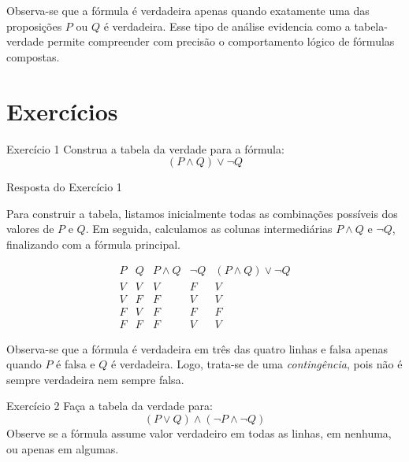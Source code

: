 \documentclass[12pt,a4paper,openright]{book}
\begin{document}
Observa-se que a fórmula é verdadeira apenas quando exatamente uma das proposições \(P\) ou \(Q\) é verdadeira. Esse tipo de análise evidencia como a tabela-verdade permite compreender com precisão o comportamento lógico de fórmulas compostas.
\section{Exercícios}

\begin{block}{Exercício 1}
Construa a tabela da verdade para a fórmula:
\[
(P \land Q) \lor \neg Q
\]
\end{block}

\begin{block}{Resposta do Exercício 1}

Para construir a tabela, listamos inicialmente todas as combinações possíveis dos valores de \(P\) e \(Q\). Em seguida, calculamos as colunas intermediárias \(P \land Q\) e \(\neg Q\), finalizando com a fórmula principal.

\[
\begin{array}{c|c|c|c|c}
P & Q & P \land Q & \neg Q & (P \land Q) \lor \neg Q \\ \hline
V & V & V & F & V \\
V & F & F & V & V \\
F & V & F & F & F \\
F & F & F & V & V
\end{array}
\]

Observa-se que a fórmula é verdadeira em três das quatro linhas e falsa apenas quando \(P\) é falsa e \(Q\) é verdadeira. Logo, trata-se de uma \emph{contingência}, pois não é sempre verdadeira nem sempre falsa.
\end{block}

\begin{block}{Exercício 2}
Faça a tabela da verdade para:
\[
(P \lor Q) \land (\neg P \land \neg Q)
\]
Observe se a fórmula assume valor verdadeiro em todas as linhas, em nenhuma, ou apenas em algumas.
\end{block}
\end{document}
